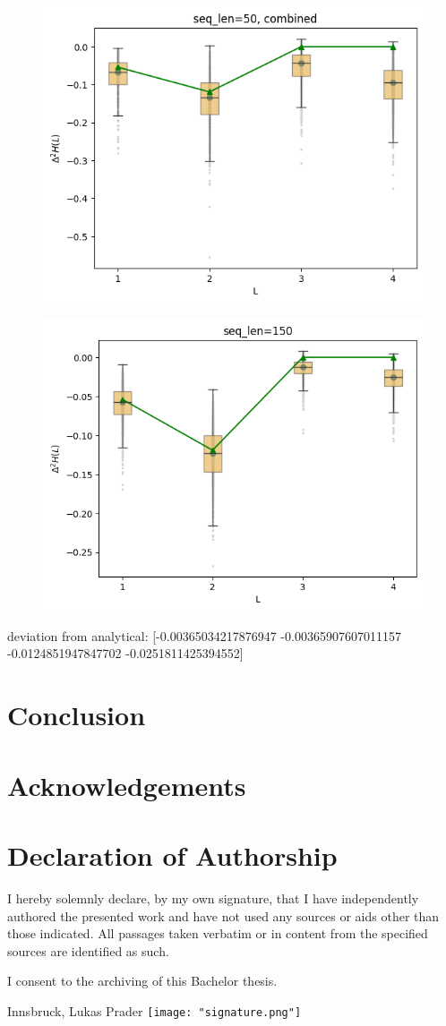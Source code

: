 \documentclass[12pt,a4paper]{article}
\begin{document}
\begin{figure}
    \centering
    \includegraphics[width=0.5\linewidth]{../figures/predictability_gain_estimation.png}
\end{figure}

\begin{figure}
    \centering
    \includegraphics[width=0.5\linewidth]{../figures/predictability_gain_estimation_optimal.png}
\end{figure}

deviation from analytical:
[-0.00365034217876947 -0.00365907607011157 -0.0124851947847702
-0.0251811425394552]

\section{Conclusion} \label{sec:conclusion}


\section{Acknowledgements} \label{sec:acknowledgements}


\clearpage
\section*{Declaration of Authorship}

I hereby solemnly declare, by my own signature, that I have independently authored the presented work and have not used any sources or aids other than those indicated. All passages taken verbatim or in content from the specified sources are identified as such.

I consent to the archiving of this Bachelor thesis.

\hfill
\vspace{2cm} Innsbruck, \findate \hfill Lukas Prader \texttt{[image: "signature.png"]}


\newpage
\printbibliography[]

\end{document}
